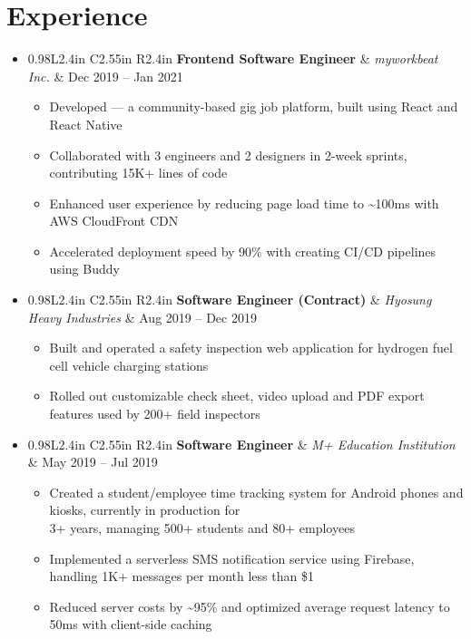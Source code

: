 \documentclass[letterpaper,11pt]{article}
\makeatletter
\newcommand{\myuline}[1]{%
  \uline{\phantom{#1}}%
  \llap{\contour{white}{#1}}%
}
\newcommand{\resumeItem}[1]{
  \item\small{
    {#1 \vspace{-2pt}}
  }
}
\newcommand{\resumeSubheading}[4]{
  \item
    \begin{tabular*}{0.98\textwidth}[t]{l@{\extracolsep{\fill}}r}
      \textbf{#1} & #2 \\
      \textit{\small#3} & \textit{\small #4} \\
    \end{tabular*}\vspace{-6pt}
}
\newcommand{\resumeEntry}[3]{
  \item
    \begin{tabular*}{0.98\textwidth}{L{2.4in} C{2.55in} R{2.4in}}
      \textbf{#1} & \textit{\small#2} & {#3} \\
    \end{tabular*}\vspace{-5.5pt}
}
\newcommand{\resumeSubHeadingListStart}{\begin{itemize}[leftmargin=0.1in, label={}]}
\newcommand{\resumeSubHeadingListEnd}{\end{itemize}}
\newcommand{\resumeItemListStart}{\begin{itemize}[leftmargin=0.25in]}
\newcommand{\resumeItemListEnd}{\end{itemize}\vspace{-5.5pt}}
\makeatother
\begin{document}
\section{Experience}
  \resumeSubHeadingListStart

    \resumeEntry
      {Frontend Software Engineer}{myworkbeat Inc.}{Dec 2019 -- Jan 2021}
      \resumeItemListStart
        \resumeItem{Developed \href{https://apple.co/3La39ZX}{\myuline{\textbf{sugosugo}}} --- a community-based gig job platform, built using React and React Native}
        \resumeItem{Collaborated with 3 engineers and 2 designers in 2-week sprints, contributing 15K+ lines of code}
        \resumeItem{Enhanced user experience by reducing page load time to \textasciitilde{}100ms with AWS CloudFront CDN}
        \resumeItem{Accelerated deployment speed by 90\% with creating CI/CD pipelines using Buddy}
      \resumeItemListEnd

    \resumeEntry
      {Software Engineer (Contract)}{Hyosung Heavy Industries}{Aug 2019 -- Dec 2019}
      \resumeItemListStart
        \resumeItem{Built and operated a safety inspection web application for hydrogen fuel cell vehicle charging stations}
        \resumeItem{Rolled out customizable check sheet, video upload and PDF export features used by 200+ field inspectors}
      \resumeItemListEnd

    \resumeEntry
      {Software Engineer}{M+ Education Institution}{May 2019 -- Jul 2019}
      \resumeItemListStart
        \resumeItem{Created a student/employee time tracking system for Android phones and kiosks, currently in production for \\ 3+ years, managing 500+ students and 80+ employees}
        \resumeItem{Implemented a serverless SMS notification service using Firebase, handling 1K+ messages per month less than \$1}
        \resumeItem{Reduced server costs by \textasciitilde{}95\% and optimized average request latency to 50ms with client-side caching}
      \resumeItemListEnd


  \resumeSubHeadingListEnd


\end{document}
